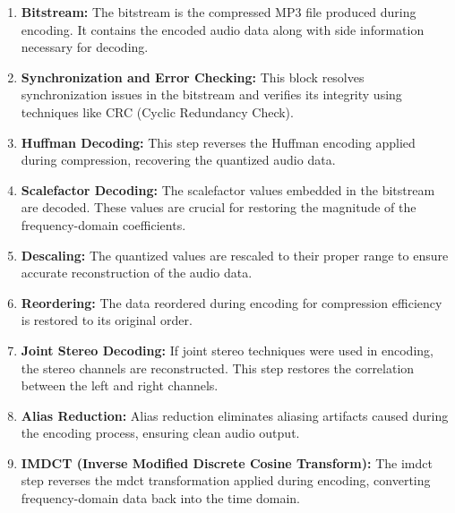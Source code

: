         \begin{enumerate}[label=\textbf{\roman*.}]
            \item \textbf{Bitstream:}  
            The bitstream is the compressed MP3 file produced during encoding. It contains the encoded audio data along with side information necessary for decoding.
        
            \item \textbf{Synchronization and Error Checking:}  
            This block resolves synchronization issues in the bitstream and verifies its integrity using techniques like CRC (Cyclic Redundancy Check).
        
            \item \textbf{Huffman Decoding:}  
            This step reverses the Huffman encoding applied during compression, recovering the quantized audio data.
        
            \item \textbf{Scalefactor Decoding:}  
            The scalefactor values embedded in the bitstream are decoded. These values are crucial for restoring the magnitude of the frequency-domain coefficients.
        
            \item \textbf{Descaling:}  
            The quantized values are rescaled to their proper range to ensure accurate reconstruction of the audio data.
        
            \item \textbf{Reordering:}  
            The data reordered during encoding for compression efficiency is restored to its original order.
        
            \item \textbf{Joint Stereo Decoding:}  
            If joint stereo techniques were used in encoding, the stereo channels are reconstructed. This step restores the correlation between the left and right channels.
        
            \item \textbf{Alias Reduction:}  
            Alias reduction eliminates aliasing artifacts caused during the encoding process, ensuring clean audio output.
        
            \item \textbf{IMDCT (Inverse Modified Discrete Cosine Transform):}  
            The \gls{imdct} step reverses the \gls{mdct} transformation applied during encoding, converting frequency-domain data back into the time domain.
        

\end{enumerate}
